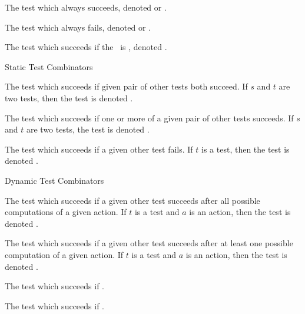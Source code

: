 \startitemize[n]

\item The test which always succeeds, denoted \quote{\true} or 
\quote{\top}. 

\item The test which always fails, denoted \quote{\false} or 
\quote{\bottom}. 

\item The test which succeeds if the  \lol\ is 
, denoted \quote{\isNil}.

\stopitemize

\item Static Test Combinators

\startitemize[n]

\item The test which succeeds if given pair of other tests both succeed. 
If $s$ and $t$ are two tests, then the  test is denoted 
.

\item The test which succeeds if one or more of a given pair of other 
tests succeeds. If $s$ and $t$ are two tests, the  test 
is denoted .

\item The test which succeeds if a given other test fails. If $t$ is a 
test, then the  test is denoted . 

\stopitemize

\item Dynamic Test Combinators

\startitemize[n]

\item The test which succeeds if a given other test succeeds after all 
possible computations of a given action. If $t$ is a test and $a$ is an 
action, then the  test is denoted . 

\item The test which succeeds if a given other test succeeds after at 
least one possible computation of a given action. If $t$ is a test and $a$ 
is an action, then the  test is denoted 
. 

\item The test which succeeds if .

\item The test which succeeds if . 

